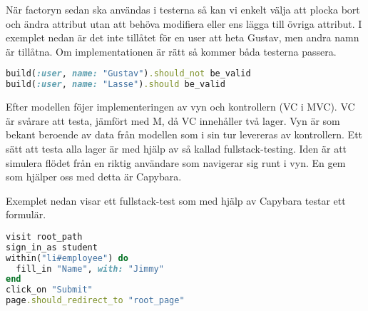 När factoryn sedan ska användas i testerna så kan vi enkelt välja att plocka bort och ändra attribut utan att behöva modifiera eller ens lägga till övriga attribut. I exemplet nedan är det inte tillåtet för en user att heta Gustav, men andra namn är tillåtna. Om implementationen är rätt så kommer båda testerna passera.

\begin{lstlisting}[language=Ruby]
build(:user, name: "Gustav").should_not be_valid
build(:user, name: "Lasse").should be_valid
\end{lstlisting}

Efter modellen föjer implementeringen av vyn och kontrollern (VC i MVC). VC är svårare att testa, jämfört med M, då VC innehåller två lager. Vyn är som bekant beroende av data från modellen som i sin tur levereras av kontrollern. Ett sätt att testa alla lager är med hjälp av så kallad fullstack-testing. Iden är att simulera flödet från en riktig användare som navigerar sig runt i vyn. En gem som hjälper oss med detta är Capybara.

Exemplet nedan visar ett fullstack-test som med hjälp av Capybara testar ett formulär.

\begin{lstlisting}[language=Ruby]
visit root_path
sign_in_as student
within("li#employee") do
  fill_in "Name", with: "Jimmy"
end
click_on "Submit"
page.should_redirect_to "root_page"
\end{lstlisting}
